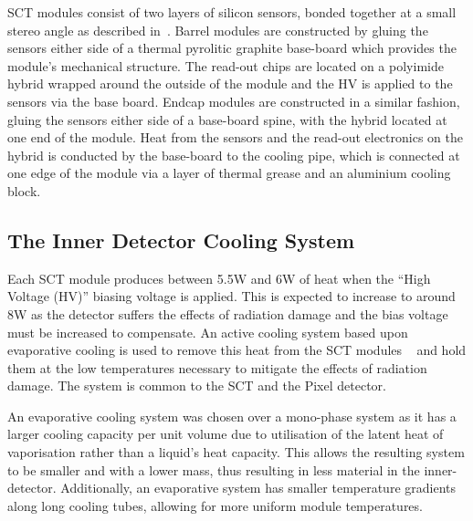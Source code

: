 SCT modules consist of two layers of silicon sensors, bonded together at a small
stereo angle as described in~. Barrel modules are constructed
by gluing the sensors either side of a thermal pyrolitic graphite base-board
which provides the module's mechanical structure. The read-out chips are located on a
polyimide hybrid wrapped around the outside of the module and the HV is applied
to the sensors via the base board. Endcap modules are constructed in a similar
fashion, gluing the sensors either side of a base-board spine, with the hybrid
located at one end of the module.  
Heat from the sensors and the read-out electronics on the hybrid is conducted by
the base-board to the cooling pipe, which is connected at one edge of the module
via a layer of thermal grease and an aluminium cooling block.

\subsection{The Inner Detector Cooling System}
\label{sec:SCT-CoolingDesc}
Each SCT module produces between 5.5W and 6W of heat when the ``High
Voltage (HV)'' biasing voltage is applied. This is expected
to increase to around 8W as the detector suffers the effects of radiation
damage and the bias voltage must be increased to compensate. 
An active cooling system based upon
evaporative cooling is used to remove this heat from the SCT modules
~\cite{1748-0221-3-07-P07003} and hold them at the low temperatures necessary to
mitigate the effects of radiation damage. The system is common to the SCT and
the Pixel detector. 

An evaporative cooling system was chosen over a mono-phase system as it has a
larger cooling capacity per unit volume due to utilisation of the latent heat of
vaporisation rather than a liquid's heat capacity. This allows the resulting
system to be smaller and with a lower mass, thus resulting in less material in
the inner-detector. Additionally, an evaporative system has
smaller temperature gradients along long cooling tubes, allowing for more
uniform module temperatures.

